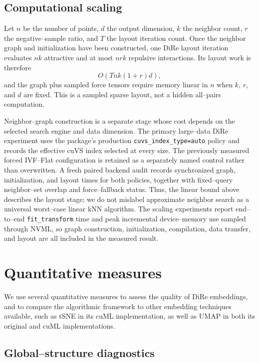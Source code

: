 \documentclass[11pt]{article}
\begin{document}
\subsection{Computational scaling}

Let $n$ be the number of points, $d$ the output dimension, $k$ the neighbor count, $r$ the negative--sample ratio, and $T$ the layout iteration count. Once the neighbor graph and initialization have been constructed, one DiRe layout iteration evaluates $nk$ attractive and at most $nrk$ repulsive interactions. Its layout work is therefore
\[
O\!\left(T n k(1+r)d\right),
\]
and the graph plus sampled force tensors require memory linear in $n$ when $k$, $r$, and $d$ are fixed. This is a sampled sparse layout, not a hidden all--pairs computation.

Neighbor--graph construction is a separate stage whose cost depends on the
selected search engine and data dimension. The primary large--data DiRe
experiment uses the package's production \texttt{cuvs\_index\_type=auto}
policy and records the effective cuVS index selected at every size. The
previously measured forced IVF--Flat configuration is retained as a separately
named control rather than overwritten. A fresh paired backend audit records
synchronized graph, initialization, and layout times for both policies,
together with fixed--query neighbor--set overlap and force--fallback status.
Thus, the linear bound above describes the layout stage; we do not mislabel
approximate neighbor search as a universal worst--case linear kNN algorithm.
The scaling experiments report end--to--end \texttt{fit\_transform} time and
peak incremental device--memory use sampled through NVML, so graph
construction, initialization, compilation, data transfer, and layout are all
included in the measured result.
    
\section{Quantitative measures}

We use several quantitative measures to assess the quality of DiRe embeddings, and to compare the algorithmic framework to other embedding techniques available, such as tSNE in its cuML implementation, as well as UMAP in both its original and cuML implementations.

\subsection{Global--structure diagnostics}
\end{document}
